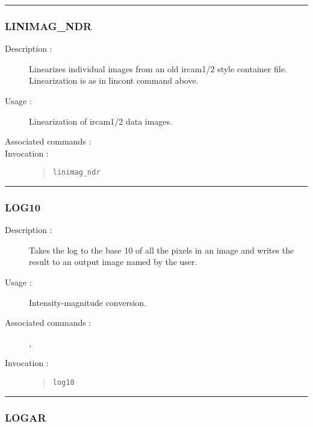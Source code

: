 \hrule
\subsubsection*{\label{LINIMAG_NDR}LINIMAG\_NDR}

\begin{description}

\item[Description :] Linearizes individual images from an old {\sc ircam1/2}
style container file.  Linearization is as in lincont command above.

\item[Usage :] Linearization of {\sc ircam1/2} data images.

\item[Associated commands :] {\tt {}}

\item[Invocation :]

\begin{quote}{\tt  linimag\_ndr }\end{quote}

\end{description}

\hrule
\subsubsection*{\label{LOG10}LOG10}

\begin{description}

\item[Description :] Takes the log to the base 10 of all the pixels in
an image and writes the result to an output image named by the user.

\item[Usage :] Intensity-magnitude conversion.
\item[Associated commands :] {\tt {}},
{\tt {}}
\item[Invocation :]

\begin{quote}{\tt  log10 }\end{quote}

\end{description}

\hrule
\subsubsection*{\label{LOGAR}LOGAR}

